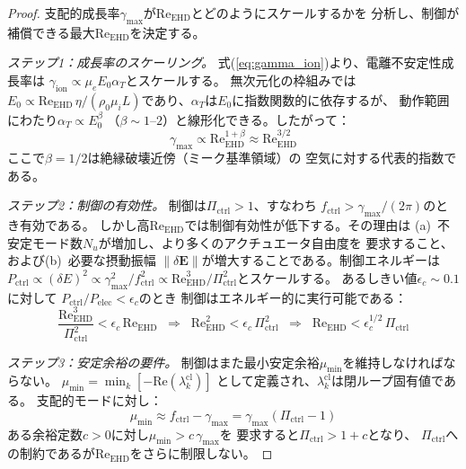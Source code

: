 \documentclass[12pt,twocolumn]{ltjsarticle}
\newcommand{\ee}{\mathbf{E}}
\newcommand{\Reehd}{\mathrm{Re}_{\mathrm{EHD}}}
\newcommand{\Pctrl}{\Pi_{\mathrm{ctrl}}}
\begin{document}
\begin{proof}
支配的成長率$\gamma_{\max}$が$\Reehd$とどのようにスケールするかを
分析し、制御が補償できる最大$\Reehd$を決定する。

\textit{ステップ1：成長率のスケーリング。}
式(\ref{eq:gamma_ion})より、電離不安定性成長率は
$\gamma_{\mathrm{ion}} \propto \mu_e E_0 \alpha_T$とスケールする。
無次元化の枠組みでは$E_0 \propto \Reehd\,\eta /
(\rho_0 \mu_i L)$であり、$\alpha_T$は$E_0$に指数関数的に依存するが、
動作範囲にわたり$\alpha_T \propto E_0^\beta$
（$\beta \sim 1$--$2$）と線形化できる。したがって：
\begin{equation}
  \gamma_{\max} \propto \Reehd^{1+\beta}
  \approx \Reehd^{3/2}
  \label{eq:gamma_scaling}
\end{equation}
ここで$\beta = 1/2$は絶縁破壊近傍（ミーク基準領域）の
空気に対する代表的指数である。

\textit{ステップ2：制御の有効性。}
制御は$\Pctrl > 1$、すなわち
$f_{\mathrm{ctrl}} > \gamma_{\max}/(2\pi)$のとき有効である。
しかし高$\Reehd$では制御有効性が低下する。その理由は
(a)~不安定モード数$N_u$が増加し、より多くのアクチュエータ自由度を
要求すること、および(b)~必要な摂動振幅
$\|\delta\ee\|$が増大することである。制御エネルギーは
$P_{\mathrm{ctrl}} \propto (\delta E)^2 \propto
\gamma_{\max}^2 / f_{\mathrm{ctrl}}^2 \propto
\Reehd^3 / \Pctrl^2$とスケールする。
あるしきい値$\epsilon_c \sim 0.1$に対して
$P_{\mathrm{ctrl}} / P_{\mathrm{elec}} < \epsilon_c$のとき
制御はエネルギー的に実行可能である：
\begin{equation}
  \frac{\Reehd^3}{\Pctrl^2} < \epsilon_c\,\Reehd
  \;\;\Longrightarrow\;\;
  \Reehd^2 < \epsilon_c\,\Pctrl^2
  \;\;\Longrightarrow\;\;
  \Reehd < \epsilon_c^{1/2}\,\Pctrl
  \label{eq:energetic_bound}
\end{equation}

\textit{ステップ3：安定余裕の要件。}
制御はまた最小安定余裕$\mu_{\min}$を維持しなければならない。
$\mu_{\min} = \min_k[-\mathrm{Re}(\lambda_k^{\mathrm{cl}})]$
として定義され、$\lambda_k^{\mathrm{cl}}$は閉ループ固有値である。
支配的モードに対し：
\begin{equation}
  \mu_{\min} \approx f_{\mathrm{ctrl}} - \gamma_{\max}
  = \gamma_{\max}(\Pctrl - 1)
  \label{eq:stability_margin}
\end{equation}
ある余裕定数$c > 0$に対し$\mu_{\min} > c\,\gamma_{\max}$を
要求すると$\Pctrl > 1 + c$となり、
$\Pctrl$への制約であるが$\Reehd$をさらに制限しない。


\end{proof}
\end{document}
